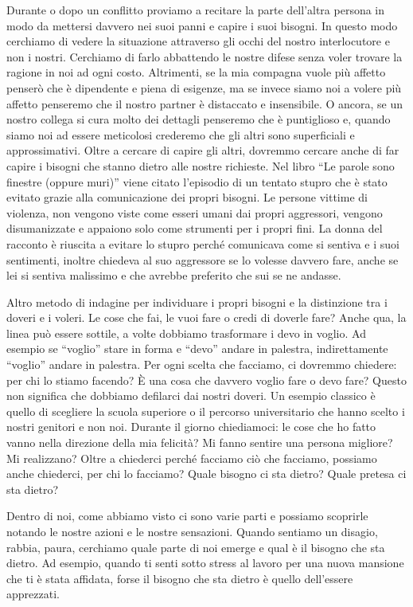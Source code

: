 \documentclass[12pt]{book} %
\begin{document}
Durante o dopo un conflitto proviamo a recitare la parte dell'altra persona in modo da mettersi davvero nei suoi panni e capire
i suoi bisogni. In questo modo cerchiamo di vedere la situazione attraverso gli occhi del nostro interlocutore e non i
nostri. Cerchiamo di farlo abbattendo le nostre difese senza voler trovare la ragione in noi ad ogni costo.
Altrimenti, se la mia compagna vuole più affetto penserò che è dipendente e piena di esigenze, ma se invece siamo noi a
volere più affetto penseremo che il nostro partner è distaccato e insensibile. O ancora, se un nostro collega si cura
molto dei dettagli penseremo che è puntiglioso e, quando siamo noi ad essere meticolosi crederemo che gli altri sono
superficiali e approssimativi. Oltre a cercare di capire gli altri, dovremmo cercare anche di far capire i bisogni che
stanno dietro alle nostre richieste. Nel libro “Le parole sono finestre (oppure
muri)” viene
citato l'episodio di un tentato stupro che è stato evitato grazie alla comunicazione dei
propri bisogni. Le persone vittime di violenza, non vengono viste come esseri umani dai propri aggressori, vengono
disumanizzate e appaiono solo come strumenti per i propri fini. La donna del racconto è riuscita a evitare lo stupro
perché comunicava come si sentiva e i suoi sentimenti, inoltre chiedeva al suo aggressore se lo volesse davvero fare,
anche se lei si sentiva malissimo e che avrebbe preferito che sui se ne andasse. 

Altro metodo di indagine per individuare i propri bisogni e la distinzione tra i doveri e i voleri. Le cose che fai, le
vuoi fare o credi di doverle fare? Anche qua, la linea può essere sottile, a volte dobbiamo trasformare i devo in
voglio. Ad esempio se “voglio” stare in forma e “devo” andare in palestra, indirettamente “voglio” andare in palestra.
Per ogni scelta che facciamo, ci dovremmo chiedere: per chi
lo stiamo facendo? È una cosa che davvero voglio fare o devo fare? Questo non significa che dobbiamo defilarci dai
nostri doveri. Un esempio classico è quello di scegliere la scuola superiore o il percorso universitario che hanno
scelto i nostri genitori e non noi. Durante il giorno chiediamoci: le cose che ho fatto vanno nella direzione della
mia felicità? Mi fanno sentire una persona migliore? Mi realizzano? 
Oltre a chiederci perché facciamo ciò che facciamo, possiamo anche chiederci, per chi lo facciamo?
Quale bisogno ci sta dietro? Quale pretesa ci sta dietro?

Dentro di noi, come abbiamo visto ci sono varie parti e possiamo scoprirle notando le nostre azioni e le nostre
sensazioni. Quando sentiamo un disagio, rabbia, paura, cerchiamo quale parte di noi emerge e qual è il bisogno che sta
dietro. Ad esempio, quando ti senti sotto stress al lavoro per una nuova mansione che ti è stata affidata, forse il bisogno che sta dietro è quello dell'essere apprezzati.
\end{document}
